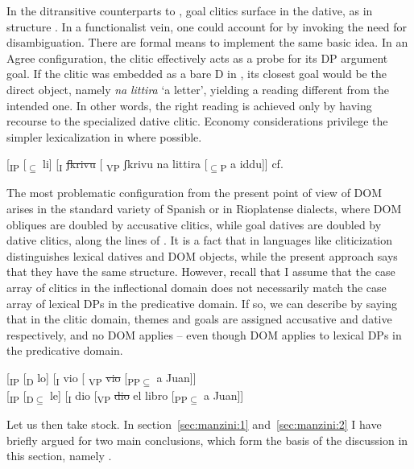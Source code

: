 \documentclass[output=paper,colorlinks,citecolor=brown]{./langscibook}
\begin{document}
In the ditransitive counterparts to , goal clitics surface in the dative, as in structure . In a functionalist vein, one could account for  by invoking the need for disambiguation. There are formal means to implement the same basic idea. In an Agree configuration, the clitic effectively acts as a probe for its DP argument goal. If the clitic was embedded as a bare D in , its closest goal would be the direct object, namely \textit{na} \textit{littira} ‘a letter’, yielding a reading different from the intended one. In other words, the right reading is achieved only by having recourse to the specialized dative clitic. Economy considerations privilege the simpler lexicalization in  where possible.

\ea%
    \label{ex:manzini:27}
    [\textsubscript{IP} [\textsubscript{${\subseteq}$} li] [\textsubscript{I} \sout{ʃkrivu}  [\textsubscript{ VP} ʃkrivu na littira  [\textsubscript{${\subseteq}$P} a iddu]]    \hfill cf. 
\z

The most problematic configuration from the present point of view of DOM arises in the standard variety of Spanish or in Rioplatense dialects, where DOM obliques are doubled by accusative clitics, while goal datives are doubled by dative clitics, along the lines of . It is a fact that in languages like  cliticization distinguishes lexical datives and DOM objects, while the present approach says that they have the same structure. However, recall that I assume that the case array of clitics in the inflectional domain does not necessarily match the case array of lexical DPs in the predicative domain. If so, we can describe  by saying that in the clitic domain, themes and goals are assigned accusative and dative respectively, and no DOM applies – even though DOM applies to lexical DPs in the predicative domain.

\ea%
    \label{ex:manzini:28}
    \ea\label{ex:manzini:28a}
    [\textsubscript{IP} [\textsubscript{D} lo]  [\textsubscript{I} vio   [\textsubscript{ VP} \sout{vio}  [\textsubscript{PP${\subseteq}$} a Juan]]\\
    \ex\label{ex:manzini:28b}
    [\textsubscript{IP} [\textsubscript{D${\subseteq}$} le] [\textsubscript{I} dio [\textsubscript{VP} \sout{dio} el libro [\textsubscript{PP${\subseteq}$} a Juan]]     
    \z 
\z 

Let us then take stock. In section~\ref{sec:manzini:1} and~\ref{sec:manzini:2} I have briefly argued for two main conclusions, which form the basis of the discussion in this section, namely .
\end{document}
